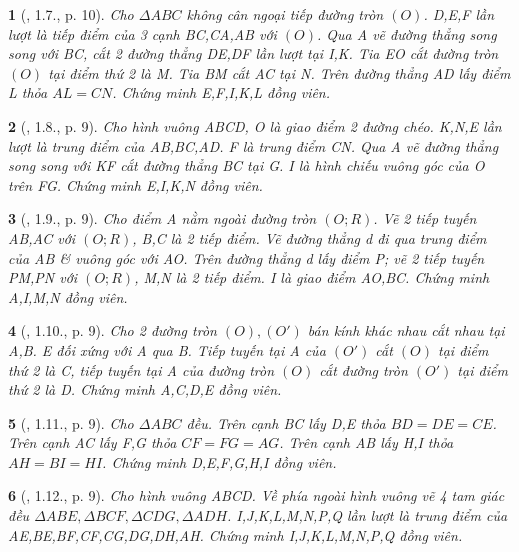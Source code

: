 \documentclass{article}
\newtheorem{baitoan}{}
\begin{document}
\begin{baitoan}[\cite{Thu_Chung_Viet_Minh_circ}, 1.7., p. 10]
	Cho $\Delta ABC$ không cân ngoại tiếp đường tròn $(O)$. D,E,F lần lượt là tiếp điểm của 3 cạnh BC,CA,AB với $(O)$. Qua A vẽ đường thẳng song song với BC, cắt 2 đường thẳng DE,DF lần lượt tại I,K. Tia EO cắt đường tròn $(O)$ tại điểm thứ 2 là M. Tia BM cắt AC tại N. Trên đường thẳng AD lấy điểm L thỏa $AL = CN$. Chứng minh E,F,I,K,L đồng viên.
\end{baitoan}

\begin{baitoan}[\cite{Thu_Chung_Viet_Minh_circ}, 1.8., p. 9]
	Cho hình vuông ABCD, O là giao điểm 2 đường chéo. K,N,E lần lượt là trung điểm của AB,BC,AD. F là trung điểm CN. Qua A vẽ đường thẳng song song với KF cắt đường thẳng BC tại G. I là hình chiếu vuông góc của O trên FG. Chứng minh E,I,K,N đồng viên.
\end{baitoan}

\begin{baitoan}[\cite{Thu_Chung_Viet_Minh_circ}, 1.9., p. 9]
	Cho điểm A nằm ngoài đường tròn $(O;R)$. Vẽ 2 tiếp tuyến AB,AC với $(O;R)$, B,C là 2 tiếp điểm. Vẽ đường thẳng d đi qua trung điểm của AB \& vuông góc với AO. Trên đường thẳng d lấy điểm P; vẽ 2 tiếp tuyến PM,PN với $(O;R)$, M,N là 2 tiếp điểm. I là giao điểm AO,BC. Chứng minh A,I,M,N đồng viên.
\end{baitoan}

\begin{baitoan}[\cite{Thu_Chung_Viet_Minh_circ}, 1.10., p. 9]
	Cho 2 đường tròn $(O),(O')$ bán kính khác nhau cắt nhau tại A,B. E đối xứng với A qua B. Tiếp tuyến tại A của $(O')$ cắt $(O)$ tại điểm thứ 2 là C, tiếp tuyến tại A của đường tròn $(O)$ cắt đường tròn $(O')$ tại điểm thứ 2 là D. Chứng minh A,C,D,E đồng viên.
\end{baitoan}

\begin{baitoan}[\cite{Thu_Chung_Viet_Minh_circ}, 1.11., p. 9]
	Cho $\Delta ABC$ đều. Trên cạnh BC lấy D,E thỏa $BD = DE = CE$. Trên cạnh AC lấy F,G thỏa $CF = FG = AG$. Trên cạnh AB lấy H,I thỏa $AH = BI = HI$. Chứng minh D,E,F,G,H,I đồng viên.
\end{baitoan}

\begin{baitoan}[\cite{Thu_Chung_Viet_Minh_circ}, 1.12., p. 9]
	Cho hình vuông ABCD. Về phía ngoài hình vuông vẽ 4 tam giác đều $\Delta ABE,\Delta BCF,\Delta CDG,\Delta ADH$. I,J,K,L,M,N,P,Q lần lượt là trung điểm của AE,BE,BF,CF,CG,DG,DH,AH. Chứng minh I,J,K,L,M,N,P,Q đồng viên.
\end{baitoan}
\end{document}
